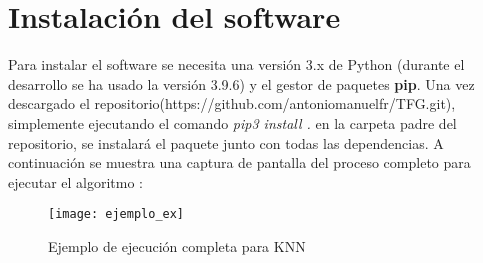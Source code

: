 \section{Instalación del software}
Para instalar el software se necesita una versión 3.x de Python (durante el desarrollo se ha usado la versión 3.9.6) y el gestor de paquetes \textbf{pip}. Una vez descargado el repositorio(https://github.com/antoniomanuelfr/TFG.git), simplemente ejecutando el comando \textit{pip3 install .} en la carpeta padre del repositorio, se instalará el paquete junto con todas las dependencias.
A continuación se muestra una captura de pantalla del proceso completo para ejecutar el algoritmo :
\begin{figure}[H]
    \texttt{[image: ejemplo\_ex]}
    \caption{Ejemplo de ejecución completa para KNN}
    \label{cap:ex}
\end{figure}


